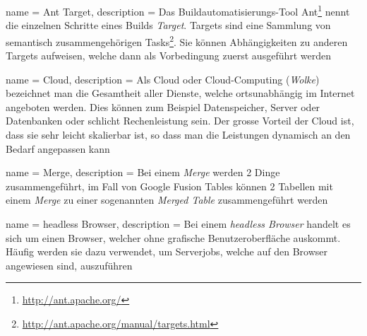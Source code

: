  {
	name = Ant Target,
	description = {Das Buildautomatisierungs-Tool Ant\footnote{\url{http://ant.apache.org/}} nennt die einzelnen Schritte eines Builds \emph{Target}. Targets sind eine Sammlung von semantisch zusammengehörigen Tasks\footnote{\url{http://ant.apache.org/manual/targets.html}}. Sie können Abhängigkeiten zu anderen Targets aufweisen, welche dann als Vorbedingung zuerst ausgeführt werden}
}

 {
	name = Cloud,
	description = {Als Cloud oder Cloud-Computing (\emph{Wolke}) bezeichnet man die Gesamtheit aller Dienste, welche ortsunabhängig im Internet angeboten werden. Dies können zum Beispiel Datenspeicher, Server oder Datenbanken oder schlicht Rechenleistung sein. Der grosse Vorteil der Cloud ist, dass sie sehr leicht skalierbar ist, so dass man  die Leistungen dynamisch an den Bedarf angepassen kann\cite{cloud}}
}

 {
	name = Merge,
	description = {Bei einem \emph{Merge} werden 2 Dinge zusammengeführt, im Fall von Google Fusion Tables können 2 Tabellen mit einem \emph{Merge} zu einer sogenannten \emph{Merged Table} zusammengeführt werden}
}

 {
	name = headless Browser,
	description = {Bei einem \emph{headless Browser} handelt es sich um einen Browser, welcher ohne grafische Benutzeroberfläche auskommt. Häufig werden sie dazu verwendet, um Serverjobs, welche auf den Browser angewiesen sind, auszuführen}
}